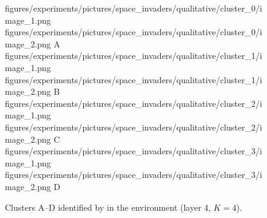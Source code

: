 \begin{figure}[H]
    \qualitativeClusterFigureSetup
    \qualitativeClusterTwo
        {figures/experiments/pictures/space_invaders/qualitative/cluster_0/image_1.png}
        {figures/experiments/pictures/space_invaders/qualitative/cluster_0/image_2.png}
        {A}
    \qualitativeClusterTwo
        {figures/experiments/pictures/space_invaders/qualitative/cluster_1/image_1.png}
        {figures/experiments/pictures/space_invaders/qualitative/cluster_1/image_2.png}
        {B}
    \qualitativeClusterTwo
        {figures/experiments/pictures/space_invaders/qualitative/cluster_2/image_1.png}
        {figures/experiments/pictures/space_invaders/qualitative/cluster_2/image_2.png}
        {C}
    \qualitativeClusterTwo
        {figures/experiments/pictures/space_invaders/qualitative/cluster_3/image_1.png}
        {figures/experiments/pictures/space_invaders/qualitative/cluster_3/image_2.png}
        {D}
    \caption{Clusters A--D identified by  in the \SpaceInvadersName environment (layer 4, $K=4$).}
    \label{fig:qualitative_space_invaders}
\end{figure}
